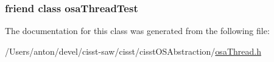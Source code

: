 \subsubsection[{osa\+Thread\+Test}]{\setlength{\rightskip}{0pt plus 5cm}friend class osa\+Thread\+Test\hspace{0.3cm}{\ttfamily [friend]}}\label{classosa_thread_a542e7acdd9a832dddf65bf204d2df936}


The documentation for this class was generated from the following file\+:\begin{DoxyCompactItemize}
\item 
/\+Users/anton/devel/cisst-\/saw/cisst/cisst\+O\+S\+Abstraction/\hyperlink{osa_thread_8h}{osa\+Thread.\+h}\end{DoxyCompactItemize}
